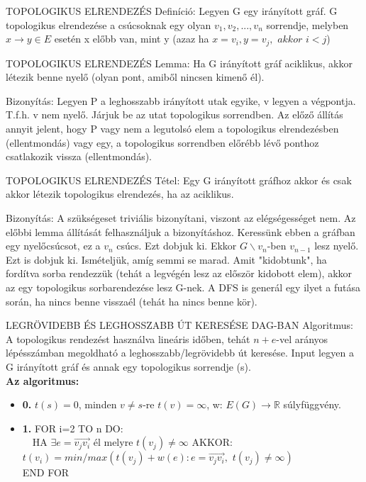 \begin{shaded}
TOPOLOGIKUS ELRENDEZÉS Definíció: Legyen G egy irányított gráf. G topologikus elrendezése a csúcsoknak egy olyan $v_1, v_2,..., v_n$ sorrendje, melyben $x\rightarrow y \in E$ esetén x előbb van, mint y (azaz ha $x = v_i, y = v_j,\,\,akkor\,\,i<j$)
\end{shaded}
\begin{framed}
TOPOLOGIKUS ELRENDEZÉS Lemma: Ha G irányított gráf aciklikus, akkor létezik benne nyelő (olyan pont, amiből nincsen kimenő él).
\end{framed}
\begin{leftbar}
Bizonyítás: Legyen P a leghosszabb irányított utak egyike, v legyen a végpontja. T.f.h. v nem nyelő. Járjuk be az utat topologikus sorrendben. Az előző állítás annyit jelent, hogy P vagy nem a legutolsó elem a topologikus elrendezésben (ellentmondás) vagy egy, a topologikus sorrendben előrébb lévő ponthoz csatlakozik vissza (ellentmondás).
\end{leftbar}
\begin{framed}
TOPOLOGIKUS ELRENDEZÉS Tétel: Egy G irányított gráfhoz akkor és csak akkor létezik topologikus elrendezés, ha az aciklikus.
\end{framed}
\begin{leftbar}
Bizonyítás: A szükségeset triviális bizonyítani, viszont az elégségességet nem. Az előbbi lemma állítását felhasználjuk a bizonyításhoz. Keressünk ebben a gráfban egy nyelőcsúcsot, ez a $v_n$ csúcs. Ezt dobjuk ki. Ekkor $G\backslash{v_n}$-ben $v_{n-1}$ lesz nyelő. Ezt is dobjuk ki. Ismételjük, amíg semmi se marad. Amit "kidobtunk", ha fordítva sorba rendezzük (tehát a legvégén lesz az először kidobott elem), akkor az egy topologikus sorbarendezése lesz G-nek. A DFS is generál egy ilyet a futása során, ha nincs benne visszaél (tehát ha nincs benne kör).
\end{leftbar}
\begin{framed}
LEGRÖVIDEBB ÉS LEGHOSSZABB ÚT KERESÉSE DAG-BAN Algoritmus: A topologikus rendezést használva lineáris időben, tehát $n+e$-vel arányos lépésszámban megoldható a leghosszabb/legrövidebb út keresése.
Input legyen a G irányított gráf és annak egy topologikus sorrendje (s).
\\
\textbf{Az algoritmus:}
\begin{itemize}
\item{\textbf{0.}} $t(s) = 0$, minden $v \neq s$-re $t(v) = \infty$, w: $E(G)\rightarrow \mathbb{R}$ súlyfüggvény.
\item{\textbf{1.}} FOR i=2 TO n DO:\\
	$\quad$HA $\exists e = \overrightarrow{v_jv_i}$ él melyre $t(v_j) \neq \infty$ AKKOR: $t(v_i) = min/max(t(v_j)+w(e): e = \overrightarrow{v_jv_i},\,\, t(v_j) \neq \infty)$
\\END FOR
\end{itemize}
\end{framed}
